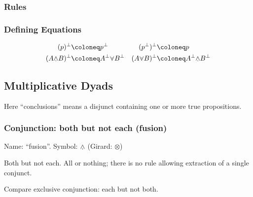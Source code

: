 \documentclass{article}
\begin{document}

\subsubsection{Rules}


\subsubsection{Defining Equations}


\begin{align*}
   \nil{(p)} &\coloneq \nil{p} & (\nil{p})^{\bot} &\coloneq p \\
   \nil{(A\fusion B)} &\coloneq \nil{A}\fission \nil{B} & \nil{(A\fission B)} &\coloneq \nil{A}\fusion\nil{B} \\
\end{align*}

\subsection{Multiplicative Dyads}

Here ``conclusions'' means a disjunct containing one or more true
propositions.

\subsubsection{Conjunction: both but not each (fusion)}

Name: ``fusion''.  Symbol: \(\fusion\) (Girard: \(\otimes\))

Both but not each. All or nothing; there is no rule allowing
extraction of a single conjunct.

Compare exclusive conjunction: each but not both.
\end{document}
